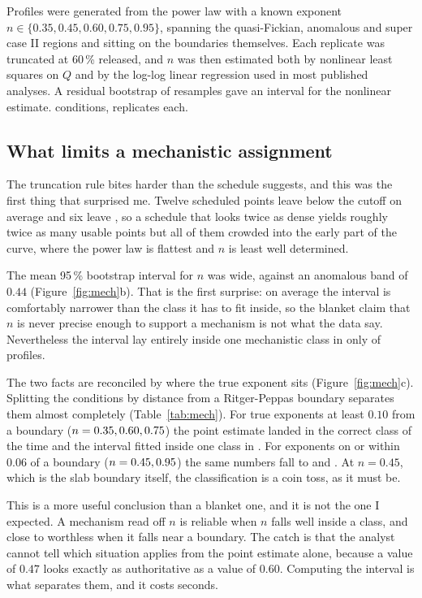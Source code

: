\documentclass[11pt,a4paper]{article}
\begin{document}
Profiles were generated from the power law with a known exponent
$n \in \{0.35, 0.45, 0.60, 0.75, 0.95\}$, spanning the quasi-Fickian,
anomalous and super case II regions and sitting on the boundaries themselves.
Each replicate was truncated at 60\,\% released, and $n$ was then estimated
both by nonlinear least squares on $Q$ and by the log-log linear regression
used in most published analyses. A residual bootstrap \cite{efron1979,davison1997} of \mechNboot{}
resamples gave an interval for the nonlinear estimate.
\mechNcond{} conditions, \mechNrep{} replicates each.

\subsection{What limits a mechanistic assignment}

The truncation rule bites harder than the schedule suggests, and this was the
first thing that surprised me. Twelve scheduled
points leave \KeptTwelve{} below the cutoff on average and six leave
\KeptSix{}, so a schedule that looks twice as dense yields roughly twice as
many usable points but all of them crowded into the early part of the curve,
where the power law is flattest and $n$ is least well determined.

The mean 95\,\% bootstrap interval for $n$ was \CIWidth{} wide, against an
anomalous band of $0.44$ (Figure~\ref{fig:mech}b). That is the first surprise: on average the interval
is comfortably narrower than the class it has to fit inside, so the blanket
claim that $n$ is never precise enough to support a mechanism is not what the
data say. Nevertheless the interval lay entirely inside one mechanistic class
in only \SingleClass{} of profiles.

The two facts are reconciled by where the true exponent sits
(Figure~\ref{fig:mech}c). Splitting the conditions by distance from a
Ritger-Peppas boundary separates them almost completely
(Table~\ref{tab:mech}). For true exponents at least $0.10$ from a
boundary ($n=0.35, 0.60, 0.75$) the point estimate landed in the correct class
\ClassCorrectInterior{} of the time and the interval fitted inside one class
in \SingleClassInterior{}. For exponents on or within $0.06$ of a boundary
($n=0.45, 0.95$) the same numbers fall to \ClassCorrectBoundary{} and
\SingleClassBoundary{}. At $n=0.45$, which is the slab boundary itself, the
classification is a coin toss, as it must be.

This is a more useful conclusion than a blanket one, and it is not the one I
expected. A mechanism read off $n$ is reliable when $n$ falls well inside a
class, and close to worthless when it falls near a boundary. The catch is that
the analyst cannot tell which situation applies from the point estimate alone,
because a value of $0.47$ looks exactly as authoritative as a value of $0.60$.
Computing the interval is what separates them, and it costs seconds.
\end{document}
